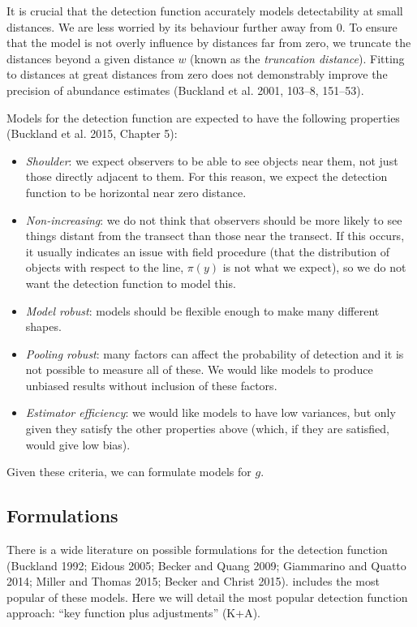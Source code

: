 \documentclass[article]{jss}
\begin{document}
It is crucial that the detection function accurately models
detectability at small distances. We are less worried by its behaviour
further away from 0. To ensure that the model is not overly influence by
distances far from zero, we truncate the distances beyond a given
distance \(w\) (known as the \emph{truncation distance}). Fitting to
distances at great distances from zero does not demonstrably improve the
precision of abundance estimates (Buckland et al. 2001, 103--8,
151--53).

Models for the detection function are expected to have the following
properties (Buckland et al. 2015, Chapter 5):

\begin{itemize}
\itemsep1pt\parskip0pt
\item
  \emph{Shoulder}: we expect observers to be able to see objects near
  them, not just those directly adjacent to them. For this reason, we
  expect the detection function to be horizontal near zero distance.
\item
  \emph{Non-increasing}: we do not think that observers should be more
  likely to see things distant from the transect than those near the
  transect. If this occurs, it usually indicates an issue with field
  procedure (that the distribution of objects with respect to the line,
  \(\pi(y)\) is not what we expect), so we do not want the detection
  function to model this.
\item
  \emph{Model robust}: models should be flexible enough to make many
  different shapes.
\item
  \emph{Pooling robust}: many factors can affect the probability of
  detection and it is not possible to measure all of these. We would
  like models to produce unbiased results without inclusion of these
  factors.
\item
  \emph{Estimator efficiency}: we would like models to have low
  variances, but only given they satisfy the other properties above
  (which, if they are satisfied, would give low bias).
\end{itemize}

Given these criteria, we can formulate models for \(g\).

\subsection{Formulations}\label{formulations}

There is a wide literature on possible formulations for the detection
function (Buckland 1992; Eidous 2005; Becker and Quang 2009; Giammarino
and Quatto 2014; Miller and Thomas 2015; Becker and Christ 2015).
 includes the most popular of these models. Here we will
detail the most popular detection function approach: ``key function plus
adjustments'' (K+A).
\end{document}
